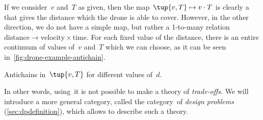 {\begin{example}
        If we consider~$v$ and~$T$ as given, then the map~$\tup{v,T} \mapsto v\cdot T$ is clearly a  that gives the distance which the drone is able to cover.
        However, in the other direction, we do not have a simple map, but rather a 1-to-many relation $\mathrm{distance}\to \mathrm{velocity}\times \mathrm{time}$.
        For each fixed value of the distance, there is an entire continuum of values of~$v$ and~$T$ which we can choose, as it can be seen in~\cref{fig:drone-example-antichain}.

        \begin{marginfigure}
            \centering
            \caption{Antichains in~$\tup{v,T}$ for different values of~$d$.}
            \label{fig:drone-example-antichain}
        \end{marginfigure}

    \end{example}

    In other words, using~\Pos it is not possible to make a theory of \emph{trade-offs}.
    We will introduce a more general category, called the category~\DP of \emph{design problems} (\cref{sec:dpdefinition}), which allows to describe such a theory.

}
